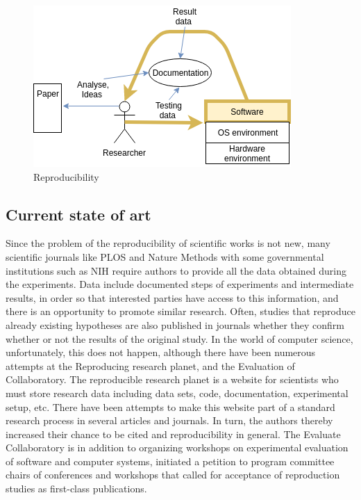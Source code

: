 \begin{figure}[h!]
  \includegraphics[scale=0.8]{fig/reproducibility.png}
  \caption{Reproducibility\cite{gith}}
  \label{fig:reproducability}
\end{figure}
\subsection{Current state of art}
Since the problem of the reproducibility of scientific works is not new, many scientific journals like PLOS and  Nature Methods with some governmental institutions such as NIH require authors to provide all the data obtained during the experiments. Data include documented steps of experiments and intermediate results, in order so that interested parties have access to this information, and there is an opportunity to promote similar research. Often, studies that reproduce already existing hypotheses are also published in journals whether they confirm whether or not the results of the original study. In the world of computer science, unfortunately, this does not happen, although there have been numerous attempts at the Reproducing research planet\cite{rrp}, and the Evaluation of Collaboratory\cite{evcol}. The reproducible research planet is a website for scientists who must store research data including data sets, code, documentation, experimental setup, etc. There have been attempts to make this website part of a standard research process in several articles and journals. In turn, the authors thereby increased their chance to be cited and reproducibility in general. The Evaluate Collaboratory is in addition to organizing workshops on experimental evaluation of software and computer systems, initiated a petition to program committee chairs of conferences and workshops that called for acceptance of reproduction studies as first-class publications.

